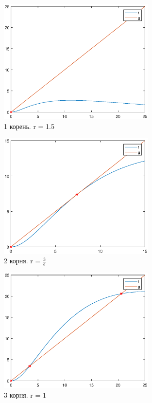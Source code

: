\documentclass[12pt]{article}
\begin{document}
\begin{figure} [H]
    \begin{center}
    \includegraphics[width=0.7\textwidth]{root1.eps}
    \caption{1 корень. r = 1.5}
    \label{pic1}
    \end{center}
\end{figure}
\begin{figure} [H]
    \begin{center}
    \includegraphics[width=0.7\textwidth]{root2.eps}
    \caption{2 корня. r = $\frac{3}{e}$}
    \label{pic2}
    \end{center}
\end{figure}
\begin{figure} [H]
    \begin{center}
    \includegraphics[width=0.7\textwidth]{root3.eps}
    \caption{3 корня. r = 1}
    \label{pic3}
    \end{center}
\end{figure}
\end{document}
